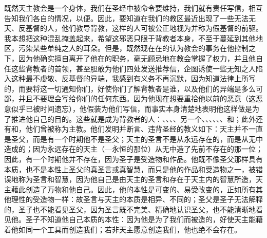 既然天主教会是一个身体，我们在圣经中被命令要维持，我们就有责任写信，相互告知我们各自的情况，以便。因此，要知道在我们的教区最近出现了一些无法无天、反基督的人，他们教导背教，这样的人可被公正地视为并称为假基督的前驱。我本想把这种混乱掩盖起来，希望这邪恶只限于背教者本身，不至于蔓延到其他地区，污染某些单纯之人的耳朵。但是，既然现在在的认为教会的事务在他控制之下，因为他确实擅自离开了他在的职务，毫无顾忌地在教会掌握了权力，并且他自任这些背教者的首领，甚至胆敢为他们四处发送推荐信，企图诱使一些无知之人陷入这种最不虔敬、反基督的异端，我感到有义务不再沉默，因为知道法律上所写的，而要将这一切通知你们，好使你们了解背教者是谁，以及他们的异端是多么可鄙，并且不要理会写给你们的任何东西。因为他现在想要重拾他以前的恶意（这恶意似乎已被时间遗忘），他假装为他们写信，而事实本身清楚地表明他这样做是为了推进他自己的目的。这些就是成为背教者的人：、、、、另一个、、、、、、和；此外还有和，他们曾被称为主教。他们发明并断言、违背圣经的教义如下：天主并不一直是圣父，而是有一个时期他不是圣父；天主的圣言不是从永远存在的，而是从无中造成的；因为永远存在的天主（---永恒的那位）从无中造了先前不存在的那一位；因此，有一个时期他并不存在，因为圣子是受造物和作品。他既不像圣父那样具有本质，也不是本性上圣父的真圣言或真智慧，而只是他的作品和受造物之一，被错误地称为圣言和智慧，因为他自己是由天主的圣言和存在于天主内的智慧所造，天主藉此创造了万物和他自己。因此，他的本性是可变的、易受改变的，正如所有其他理性的受造物一样：故圣言与天主的本质是相异、不同的；圣父是圣子无法解释的，圣子也不能看见圣父，因为圣言既不完美、精确地认识圣父，也不能清晰地看见他。圣子不知道他自己本质的本性：因为他是为了我们而被造的，好使天主能藉着他如同一个工具而创造我们；若非天主愿意创造我们，他也绝不会存在。\par


